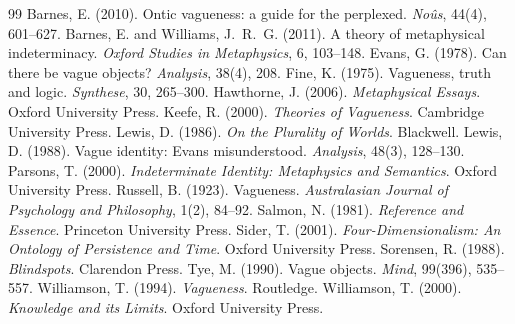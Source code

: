 \documentclass{situationist-preprint}
\begin{document}
\begin{thebibliography}{99}\small
{} Barnes, E. (2010). Ontic vagueness: a guide for the perplexed. \emph{Noûs}, 44(4), 601--627.
 Barnes, E. and Williams, J.~R.~G. (2011). A theory of metaphysical indeterminacy. \emph{Oxford Studies in Metaphysics}, 6, 103--148.
 Evans, G. (1978). Can there be vague objects? \emph{Analysis}, 38(4), 208.
 Fine, K. (1975). Vagueness, truth and logic. \emph{Synthese}, 30, 265--300.
 Hawthorne, J. (2006). \emph{Metaphysical Essays}. Oxford University Press.
 Keefe, R. (2000). \emph{Theories of Vagueness}. Cambridge University Press.
 Lewis, D. (1986). \emph{On the Plurality of Worlds}. Blackwell.
 Lewis, D. (1988). Vague identity: Evans misunderstood. \emph{Analysis}, 48(3), 128--130.
 Parsons, T. (2000). \emph{Indeterminate Identity: Metaphysics and Semantics}. Oxford University Press.
 Russell, B. (1923). Vagueness. \emph{Australasian Journal of Psychology and Philosophy}, 1(2), 84--92.
 Salmon, N. (1981). \emph{Reference and Essence}. Princeton University Press.
 Sider, T. (2001). \emph{Four-Dimensionalism: An Ontology of Persistence and Time}. Oxford University Press.
 Sorensen, R. (1988). \emph{Blindspots}. Clarendon Press.
 Tye, M. (1990). Vague objects. \emph{Mind}, 99(396), 535--557.
 Williamson, T. (1994). \emph{Vagueness}. Routledge.
 Williamson, T. (2000). \emph{Knowledge and its Limits}. Oxford University Press.
\end{thebibliography}
\end{document}
